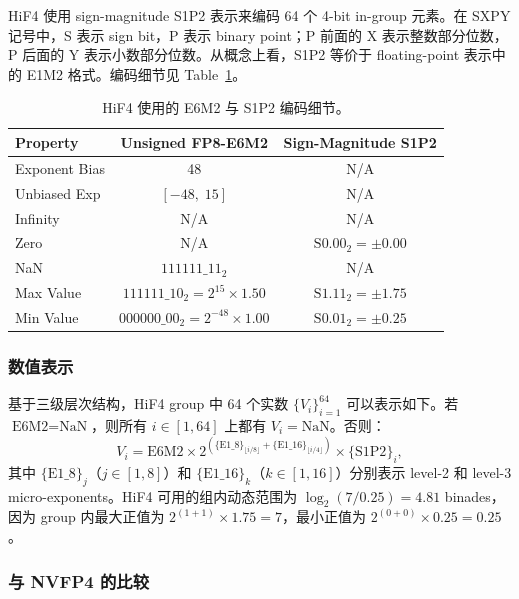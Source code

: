 \documentclass{article}
\begin{document}
HiF4 使用 sign-magnitude S1P2 表示来编码 64 个 4-bit in-group 元素。在 SXPY 记号中，S 表示 sign bit，P
表示 binary point；P 前面的 X 表示整数部分位数，P 后面的 Y 表示小数部分位数。从概念上看，S1P2 等价于 floating-point 表示中的
E1M2 格式。编码细节见 Table~\ref{tab:hif4-encoding}。

\begin{table}[h]
\caption{HiF4 使用的 E6M2 与 S1P2 编码细节。}
\label{tab:hif4-encoding}
\centering
\small
\begin{tabular}{@{}lcc@{}}
\toprule
Property & Unsigned FP8-E6M2 & Sign-Magnitude S1P2 \\
\midrule
Exponent Bias   & 48              & N/A \\
Unbiased Exp    & $[-48,\;15]$    & N/A \\
Infinity        & N/A             & N/A \\
Zero            & N/A             & $\text{S}0.00_2 = \pm 0.00$ \\
NaN             & $111111\_11_2$  & N/A \\
Max Value       & $111111\_10_2 = 2^{15} \times 1.50$ & $\text{S}1.11_2 = \pm 1.75$ \\
Min Value       & $000000\_00_2 = 2^{-48} \times 1.00$ & $\text{S}0.01_2 = \pm 0.25$ \\
\bottomrule
\end{tabular}
\end{table}

\subsubsection{数值表示}

基于三级层次结构，HiF4 group 中 64 个实数 $\{V_i\}_{i=1}^{64}$ 可以表示如下。若
$\text{E6M2} = \text{NaN}$，则所有 $i \in [1, 64]$ 上都有 $V_i = \text{NaN}$。否则：
\begin{equation}
  V_i
  =
  \text{E6M2}
  \times
  2^{\left(\{\text{E1\_8}\}_{\lfloor i/8 \rfloor}
    + \{\text{E1\_16}\}_{\lfloor i/4 \rfloor}\right)}
  \times
  \{\text{S1P2}\}_i ,
  \label{eq:hif4-value}
\end{equation}
其中 $\{\text{E1\_8}\}_j$（$j \in [1,8]$）和
$\{\text{E1\_16}\}_k$（$k \in [1,16]$）分别表示 level-2 和 level-3 micro-exponents。HiF4
可用的组内动态范围为 $\log_2(7/0.25) = 4.81$ binades，因为 group 内最大正值为
$2^{(1+1)} \times 1.75 = 7$，最小正值为 $2^{(0+0)} \times 0.25 = 0.25$。

\subsubsection{与 NVFP4 的比较}
\end{document}
